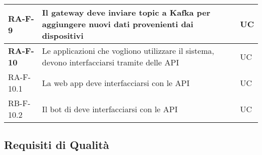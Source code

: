 \begin{center}
\begin{longtable}{|p{3cm}|p{9.85cm}|p{2cm}|}
		\textbf{RA-F-9} & Il gateway deve inviare topic a Kafka per aggiungere nuovi dati provenienti dai dispositivi  & UC \\ \hline

		\textbf{RA-F-10} & Le applicazioni che vogliono utilizzare il sistema, devono interfacciarsi tramite delle API  & UC \\ \hline
		{\color{gray} RA-F-}10.1 & La web app deve interfacciarsi con le API & UC \\ \hline
		{\color{gray} RB-F-}10.2 & Il bot di \glock{Telegram} deve interfacciarsi con le API & UC \\ \hline
		\hline




		\end{longtable}
	\end{center}

	\subsection{Requisiti di Qualità}

